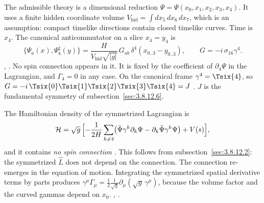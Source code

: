 The admissible theory is a dimensional reduction $\Psi=\Psi(x_0,x_1,x_2,x_3,x_4)$. It uses a finite
hidden coordinate volume $V_{\text{hid}}=\int dx_5\,dx_6\,dx_7$, which is an assumption: compact
timelike directions contain closed timelike curves. Time is $x_4$. The canonical anticommutator on
a slice $x_4=y_4$ is
\begin{equation}
  \{\Psi_a(x),\Psi^\ddagger_b(y)\}=\frac{H}{V_{\text{hid}}\sqrt{|g|}}\,G_{ab}\,\delta^4(x_{0..3}-y_{0..3}),\qquad G=-i\,\sigma_{16}\gamma^4 .
\end{equation}
 , . No spin connection appears in it. It is
fixed by the coefficient of $\partial_4\Psi$ in the Lagrangian, and $\Gamma_4=0$ in any case. On
the canonical frame $\gamma^4=\Tsix{4}$, so
$G=-i\,\Tsix{0}\Tsix{1}\Tsix{2}\Tsix{3}\Tsix{4}=J$ \cfderived. $J$ is the fundamental symmetry
of subsection~\ref{sec:3.8.12.6}.

The Hamiltonian density of the symmetrized Lagrangian is
\begin{equation}
  \mathcal H=\sqrt g\,\Bigl[-\frac{1}{2H}\sum_{k\neq4}\bigl(\bar\Psi\gamma^k\partial_k\Psi-\partial_k\bar\Psi\gamma^k\Psi\bigr)+V(s)\Bigr],
\end{equation}
and it contains \emph{no spin connection} 
. This follows from
subsection~\ref{sec:3.8.12.2}: the symmetrized $\hat L$ does not depend on the connection. The connection re-emerges
in the equation of motion. Integrating the symmetrized spatial derivative terms by parts produces
$\gamma^\mu\Gamma_\mu=\tfrac12\frac{1}{\sqrt g}\partial_\mu(\sqrt g\,\gamma^\mu)$, because the volume
factor and the curved gammas depend on $x_0$. 
, .

